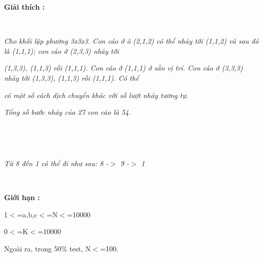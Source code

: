 \textbf{Giải thích : }

 

\emph{Cho khối lập phương 3x3x3. Con cáo ở ô (2,1,2) có thể nhảy tới (1,1,2) và sau đó là (1,1,1); con cáo ở (2,3,3) nhảy tới }

\emph{(1,3,3), (1,1,3) rồi (1,1,1). Con cáo ở (1,1,1) ở sẵn vị trí. Con cáo ở (3,3,3) nhảy tới (1,3,3), (1,1,3) rồi (1,1,1). Có thể }

\emph{có một số cách dịch chuyển khác với số lượt nhảy tương tự. }

\emph{Tổng số bước nhảy của 27 con cáo là 54. }

 

 

\emph{Từ 8 đến 1 có thể đi như sau: 8 -$>$ 9 -$>$ 1 }

 

\textbf{Giới hạn : }

1$<$=a,b,c$<$=N$<$=10000

0$<$=K$<$=10000

Ngoài ra, trong 50\% test, N$<$=100.